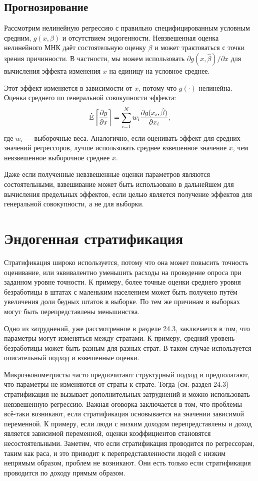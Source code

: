 \subsection{Прогнозирование}

Рассмотрим нелинейную регрессию с правильно специфицированным условным средним, $g(x, \beta)$ и отсутствием эндогенности. Невзвешенная оценка нелинейного МНК даёт состоятельную оценку $\beta$ и может трактоваться с точки зрения причинности. В частности, мы можем использовать $\partial g(x, \hat \beta)/\partial x$ для вычисления эффекта изменения $x$ на единицу на условное среднее. 

Этот эффект изменяется в зависимости от $x$, потому что $g(\cdot)$ нелинейна. Оценка среднего по генеральной совокупности эффекта:
$$
\hat {\mathbb{E}}\left[ \frac{\partial y}{\partial x}\right] = \sum_{i=1}^N w_i \frac{\partial g(x_i, \hat\beta)}{\partial x_i},
$$
где $w_i$ --- выборочные веса. Аналогично, если оценивать эффект для средних значений регрессоров, лучше использовать среднее взвешенное значение $x$, чем невзвешенное выборочное среднее $x$. 

Даже если полученные невзвешенные оценки параметров являются состоятельными, взвешивание может быть использовано в дальнейшем для вычисления предельных эффектов, если целью является получение эффектов для генеральной совокупности, а не для  выборки. 

\section{Эндогенная стратификация}

Стратификация широко используется, потому что она может повысить точность оценивание, или эквивалентно уменьшить расходы на проведение опроса при заданном уровне точности. К примеру, более точные оценки среднего уровня безработицы в штатах с маленьким населением может быть получено путём увеличения доли бедных штатов в выборке. По тем же причинам в выборках могут быть перепредставлены меньшинства. 

Одно из затруднений, уже рассмотренное в разделе 24.3, заключается в том, что параметры могут изменяться между стратами. К примеру, средний уровень безработицы может быть разным для разных страт. В таком случае используется описательный подход и взвешенные оценки. 

Микроэконометристы часто предпочитают структурный подход и предполагают, что параметры не изменяются от страты к страте. Тогда (см. раздел 24.3) стратификация не вызывает дополнительных затруднений и можно использовать невзвешенную регрессию. Важная оговорка заключается в том, что проблемы всё-таки возникают, если стратификация основывается на значении зависимой переменной. К примеру, если люди с низким доходом перепредставлены и доход является зависимой переменной, оценки коэффициентов становятся несостоятельными. Заметим, что если стратификация проводится по регрессорам, таким как раса, и это приводит к перепредставленности людей с низким непрямым образом, проблем не возникают. Они есть только если стратификация проводится по доходу прямым образом. 

